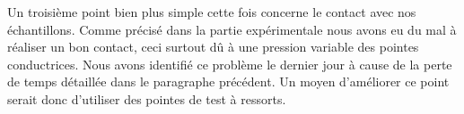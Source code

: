 Un troisième point bien plus simple cette fois concerne le contact avec nos échantillons. Comme précisé dans la partie expérimentale nous avons eu du mal à réaliser un bon contact, ceci surtout dû à une pression variable des pointes conductrices. Nous avons identifié ce problème le dernier jour à cause de la perte de temps détaillée dans le paragraphe précédent.  Un moyen d'améliorer ce point serait donc d'utiliser des pointes de test à ressorts.
